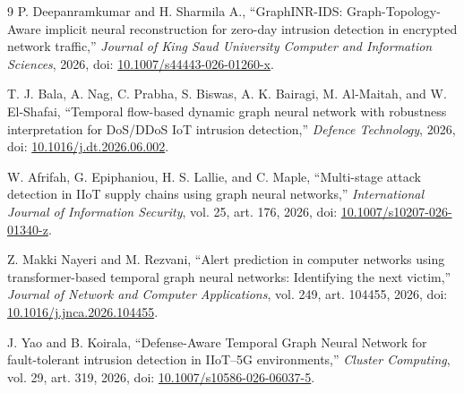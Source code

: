 \documentclass[10pt,a4paper]{article}
\begin{document}
\begin{thebibliography}{9}
\small
{}
P. Deepanramkumar and H. Sharmila A., ``GraphINR-IDS: Graph-Topology-Aware implicit neural reconstruction for zero-day intrusion detection in encrypted network traffic,'' \emph{Journal of King Saud University Computer and Information Sciences}, 2026, doi: \href{https://doi.org/10.1007/s44443-026-01260-x}{10.1007/s44443-026-01260-x}.

T. J. Bala, A. Nag, C. Prabha, S. Biswas, A. K. Bairagi, M. Al-Maitah, and W. El-Shafai, ``Temporal flow-based dynamic graph neural network with robustness interpretation for DoS/DDoS IoT intrusion detection,'' \emph{Defence Technology}, 2026, doi: \href{https://doi.org/10.1016/j.dt.2026.06.002}{10.1016/j.dt.2026.06.002}.

W. Afrifah, G. Epiphaniou, H. S. Lallie, and C. Maple, ``Multi-stage attack detection in IIoT supply chains using graph neural networks,'' \emph{International Journal of Information Security}, vol. 25, art. 176, 2026, doi: \href{https://doi.org/10.1007/s10207-026-01340-z}{10.1007/s10207-026-01340-z}.

Z. Makki Nayeri and M. Rezvani, ``Alert prediction in computer networks using transformer-based temporal graph neural networks: Identifying the next victim,'' \emph{Journal of Network and Computer Applications}, vol. 249, art. 104455, 2026, doi: \href{https://doi.org/10.1016/j.jnca.2026.104455}{10.1016/j.jnca.2026.104455}.

J. Yao and B. Koirala, ``Defense-Aware Temporal Graph Neural Network for fault-tolerant intrusion detection in IIoT--5G environments,'' \emph{Cluster Computing}, vol. 29, art. 319, 2026, doi: \href{https://doi.org/10.1007/s10586-026-06037-5}{10.1007/s10586-026-06037-5}.
\end{thebibliography}
\end{document}
